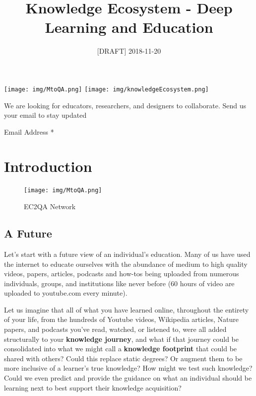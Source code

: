 \documentclass{acm_proc_article-sp}
\title{Knowledge Ecosystem - Deep Learning and Education}
\author{
\alignauthor Fanli (Christian) Zheng \\
        \affaddr{dyad x machina}\\
       \email{\href{mailto:thechristianramsey@gmail.com}{\nolinkurl{thechristianramsey@gmail.com}}}
\and \alignauthor Haohan Wang \\
        \affaddr{dyad x machina}\\
       \email{\href{mailto:haohan723@gmail.com}{\nolinkurl{haohan723@gmail.com}}}
\and }
\date{{[}DRAFT{]} 2018-11-20}
\begin{document}
\maketitle


\texttt{[image: img/MtoQA.png]}
\texttt{[image: img/knowledgeEcosystem.png]}

\hypertarget{mc_embed_signup}{}
\hypertarget{mc_embed_signup_scroll}{}
We are looking for educators, researchers, and designers to collaborate.
Send us your email to stay updated

Email Address *

\hypertarget{mce-responses}{}
\hypertarget{mce-error-response}{}

\hypertarget{mce-success-response}{}

\chapter{Introduction}\label{introduction}

\begin{figure}
\centering
\texttt{[image: img/MtoQA.png]}
\caption{EC2QA Network}
\end{figure}

\section{A Future}\label{a-future}

Let's start with a future view of an individual's education. Many of us
have used the internet to educate ourselves with the abundance of medium
to high quality videos, papers, articles, podcasts and how-tos being
uploaded from numerous individuals, groups, and institutions like never
before (60 hours of video are uploaded to youtube.com every minute).

Let us imagine that all of what you have learned online, throughout the
entirety of your life, from the hundreds of Youtube videos, Wikipedia
articles, Nature papers, and podcasts you've read, watched, or listened
to, were all added structurally to your \textbf{knowledge journey}, and
what if that journey could be consolidated into what we might call a
\textbf{knowledge footprint} that could be shared with others? Could
this replace static degrees? Or augment them to be more inclusive of a
learner's true knowledge? How might we test such knowledge? Could we
even predict and provide the guidance on what an individual should be
learning next to best support their knowledge acquisition?
\end{document}
